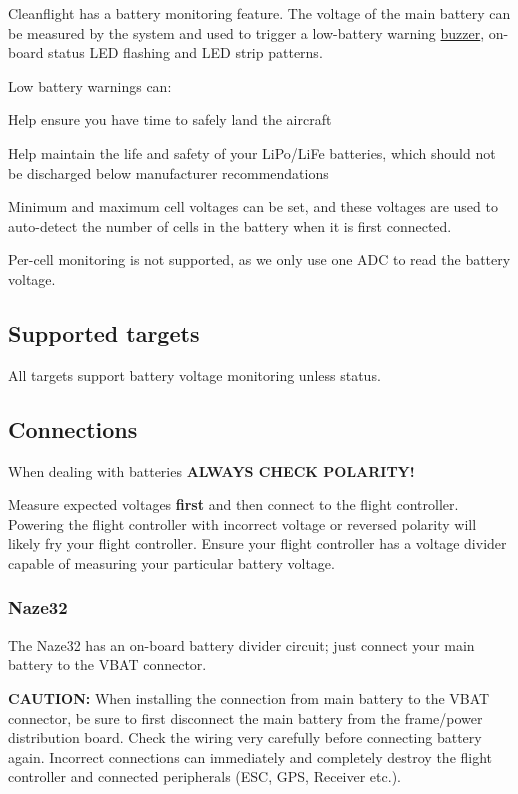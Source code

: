 Cleanflight has a battery monitoring feature. The voltage of the main battery can be measured by the system and used to trigger a low-\/battery warning \hyperlink{Buzzer_8md}{buzzer}, on-\/board status L\+E\+D flashing and L\+E\+D strip patterns.

Low battery warnings can\+:


\begin{DoxyItemize}
\item Help ensure you have time to safely land the aircraft
\item Help maintain the life and safety of your Li\+Po/\+Li\+Fe batteries, which should not be discharged below manufacturer recommendations
\end{DoxyItemize}

Minimum and maximum cell voltages can be set, and these voltages are used to auto-\/detect the number of cells in the battery when it is first connected.

Per-\/cell monitoring is not supported, as we only use one A\+D\+C to read the battery voltage.

\subsection*{Supported targets}

All targets support battery voltage monitoring unless status.

\subsection*{Connections}

When dealing with batteries {\bfseries A\+L\+W\+A\+Y\+S C\+H\+E\+C\+K P\+O\+L\+A\+R\+I\+T\+Y!}

Measure expected voltages {\bfseries first} and then connect to the flight controller. Powering the flight controller with incorrect voltage or reversed polarity will likely fry your flight controller. Ensure your flight controller has a voltage divider capable of measuring your particular battery voltage.

\subsubsection*{Naze32}

The Naze32 has an on-\/board battery divider circuit; just connect your main battery to the V\+B\+A\+T connector.

{\bfseries C\+A\+U\+T\+I\+O\+N\+:} When installing the connection from main battery to the V\+B\+A\+T connector, be sure to first disconnect the main battery from the frame/power distribution board. Check the wiring very carefully before connecting battery again. Incorrect connections can immediately and completely destroy the flight controller and connected peripherals (E\+S\+C, G\+P\+S, Receiver etc.).


